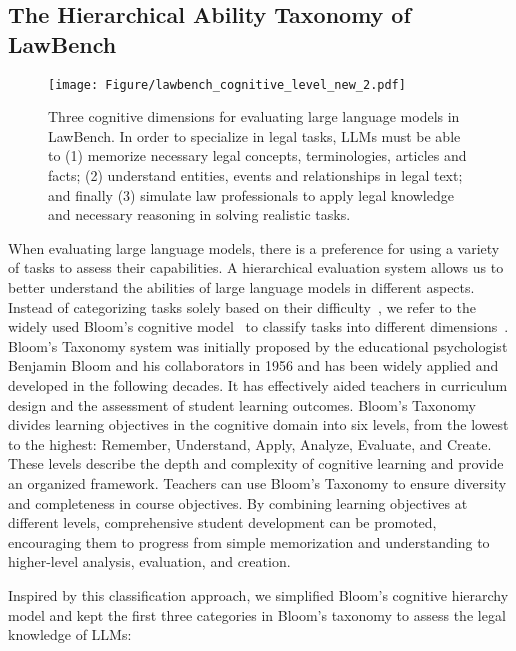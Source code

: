 \subsection{The Hierarchical Ability Taxonomy of LawBench}
\begin{figure}[t]
    \centering
    \texttt{[image: Figure/lawbench\_cognitive\_level\_new\_2.pdf]}
    \caption{Three cognitive dimensions for evaluating large language models in LawBench. In order to specialize in legal tasks, LLMs must be able to (1) memorize necessary legal concepts, terminologies, articles and facts; (2) understand entities, events and relationships in legal text; and finally (3) simulate law professionals to apply legal knowledge and necessary reasoning in solving realistic tasks.}
    \label{fig:cognitive}
\end{figure}

When evaluating large language models, there is a preference for using a variety of tasks to assess their capabilities. A hierarchical evaluation system allows us to better understand the abilities of large language models in different aspects. Instead of categorizing tasks solely based on their difficulty~\cite{huang2023c}, we refer to the widely used Bloom's cognitive model~\cite{krathwohl2002revision} to classify tasks into different dimensions~\cite{yu2023kola}. Bloom's Taxonomy system was initially proposed by the educational psychologist Benjamin Bloom and his collaborators in 1956 and has been widely applied and developed in the following decades. It has effectively aided teachers in curriculum design and the assessment of student learning outcomes. Bloom's Taxonomy divides learning objectives in the cognitive domain into six levels, from the lowest to the highest: Remember, Understand, Apply, Analyze, Evaluate, and Create. These levels describe the depth and complexity of cognitive learning and provide an organized framework. Teachers can use Bloom's Taxonomy to ensure diversity and completeness in course objectives. By combining learning objectives at different levels, comprehensive student development can be promoted, encouraging them to progress from simple memorization and understanding to higher-level analysis, evaluation, and creation.

Inspired by this classification approach, we simplified Bloom's cognitive hierarchy model and kept the first three categories in Bloom's taxonomy to assess the legal knowledge of LLMs:

